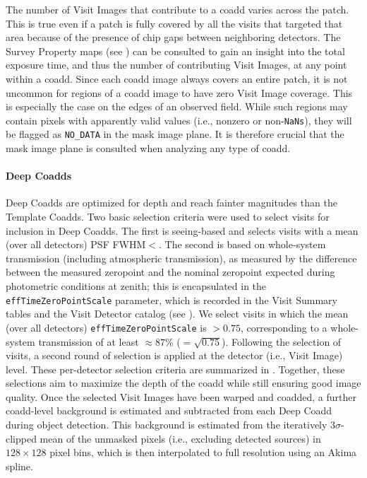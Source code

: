 The number of Visit Images that contribute to a coadd varies across the \gls{patch}.
This is true even if a \gls{patch} is fully covered by all the visits that targeted that area because of the presence of chip gaps between neighboring detectors.
The Survey Property maps (see ) can be consulted to gain an insight into the total exposure time, and thus the number of contributing \glspl{Visit Image}, at any point within a coadd.
Since each coadd image always covers an entire \gls{patch}, it is not uncommon for regions of a coadd image to have zero Visit Image coverage.
This is especially the case on the edges of an observed field.
While such regions may contain pixels with apparently valid values (i.e., nonzero or non-\texttt{NaNs}), they will be flagged as \texttt{NO\_DATA} in the mask image plane.
It is therefore crucial that the mask image plane is consulted when analyzing any type of coadd.

\paragraph{Deep Coadds}
Deep Coadds are optimized for depth and reach fainter magnitudes than the Template Coadds.
Two basic selection criteria were used to select visits for inclusion in Deep Coadds.
The first is seeing-based and selects visits with a mean (over all detectors) \gls{PSF} FWHM$<$\deepcoaddselectionfwhm.
The second is based on whole-system transmission (including atmospheric transmission), as measured by the difference between the measured zeropoint and the nominal zeropoint expected during photometric conditions at zenith; this is encapsulated in the \texttt{effTimeZeroPointScale} parameter, which is recorded in the Visit Summary tables and the Visit Detector catalog (see ).
We select visits in which the mean (over all detectors) \texttt{effTimeZeroPointScale} is $>0.75$, corresponding to a whole-system transmission of at least $\approx87\%$ ($=\sqrt{0.75}$).
Following the selection of visits, a second round of selection is applied at the detector (i.e., \gls{Visit Image}) level.
These per-detector selection criteria are summarized in .
Together, these selections aim to maximize the depth of the coadd while still ensuring good image quality.
Once the selected Visit Images have been warped and coadded, a further coadd-level background is estimated and subtracted from each Deep Coadd during object detection.
This background is estimated from the iteratively $3\sigma$-clipped mean of the unmasked pixels (i.e., excluding detected sources) in $128\times128$ pixel bins, which is then interpolated to full resolution using an Akima spline.

